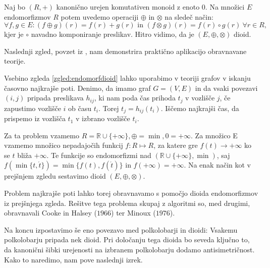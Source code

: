 \documentclass[mat1]{fmfdelo}
\newcommand{\R}{\mathbb{R}}
\begin{document}
\begin{zgled} \label{zgled:endomorfdioid}
	Naj bo $(R, +)$ kanonično urejen komutativen monoid z enoto $0$. Na množici $E$ endomorfizmov $R$ potem uvedemo operaciji $\oplus$ in $\otimes$ na sledeč način: $$\forall f, g \in E: (f\oplus g)(r) = f(r) + g(r) \text{~in~} (f\otimes g)(r) = f(r) \circ g(r) ~\forall r\in R,$$ kjer je $\circ$ navadno komponiranje preslikav. Hitro vidimo, da je $(E, \oplus, \otimes)$ dioid. 
\end{zgled}

\noindent Naslednji zgled, povzet iz \cite{bib:Gondran}, nam demonstrira praktično aplikacijo obravnavane teorije.

\begin{zgled}
	Vsebino zgleda \ref{zgled:endomorfdioid} lahko uporabimo v teoriji grafov v iskanju časovno najkrajše poti. Denimo, da imamo graf $G = (V, E)$ in da vsaki povezavi $(i, j)$ pripada preslikava $h_{ij}$, ki nam poda čas prihoda $t_j$ v vozlišče $j$, če zapustimo vozlišče $i$ ob času $t_i$. Torej $ t_j = h_{ij}(t_i)$. Iščemo najkrajši čas, da prispemo iz vozlišča $t_1$ v izbrano vozlišče $t_i$.
	
	Za ta problem vzamemo $R = \R\cup\{+\infty\}, \oplus = \min, 0 = +\infty$. Za množico E vzamemo množico nepadajočih funkcij $f: R \mapsto R$, za katere gre $f(t) \to +\infty$ ko se $t$ bliža $+\infty$. Te funkcije so endomorfizmi nad $(\R\cup\{+\infty\}, \min)$, saj $f(\min\{t, \acute{t}\}) = \min\{f(t),f(\acute{t})\}$ in $f(+\infty) = +\infty$. Na enak način kot v prejšnjem zgledu sestavimo dioid $(E, \oplus, \otimes)$.
	
	Problem najkrajše poti lahko torej obravnavamo s pomočjo dioida endomorfizmov iz prejšnjega zgleda. Rešitve tega problema skupaj z algoritmi so, med drugimi, obravnavali Cooke in Halsey ($1966$) ter Minoux ($1976$).
\end{zgled}

Na koncu izpostavimo še eno povezavo med polkolobarji in dioidi: Vsakemu polkolobarju pripada nek dioid. Pri določanju tega dioida bo seveda ključno to, da kanonični šibki urejenosti na izbranem polkolobarju dodamo antisimetričnost. Kako to naredimo, nam pove naslednji izrek.
\end{document}
